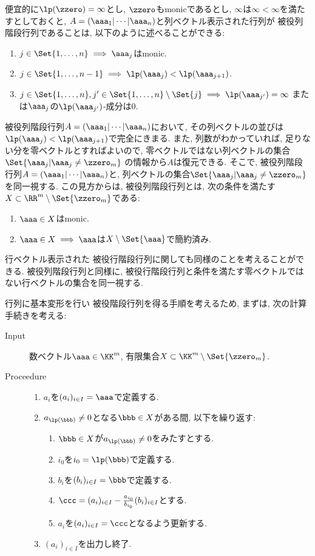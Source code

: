 便宜的に$\lp(\zzero)=\infty$とし, 
$\zzero$もmonicであるとし,
$\infty$は$\infty<\infty$を満たすとしておくと,
$A=(\aaa_1|\cdots|\aaa_n)$と列ベクトル表示された行列が
被役列階段行列であることは, 以下のように述べることができる:
\begin{enumerate}
\item
  $j\in\Set{1,\ldots,n}\implies \aaa_j$はmonic.
\item
  $j\in\Set{1,\ldots, n-1} \implies \lp(\aaa_j)<\lp(\aaa_{j+1})$.
\item
  $j\in\Set{1,\ldots, n}, j'\in \Set{1,\ldots, n}\setminus\Set{j}\implies \lp(\aaa_{j'})=\infty$
  または$\aaa_j$の$\lp(\aaa_{j'})$-成分は$0$.
\end{enumerate}
被役列階段行列$A=(\aaa_1|\cdots|\aaa_n)$において,
その列ベクトルの並びは
$\lp(\aaa_j)<\lp(\aaa_{j+1})$で完全にきまる.
また, 列数がわかっていれば, 足りない分を零ベクトルとすればよいので,
零ベクトルではない列ベクトルの集合$\Set{\aaa_j|\aaa_j\neq \zzero_m}$
の情報から$A$は復元できる.
そこで, 
被役列階段行列$A=(\aaa_1|\cdots|\aaa_n)$と,
列ベクトルの集合$\Set{\aaa_j|\aaa_j\neq \zzero_m}$を同一視する.
この見方からは,
被役列階段行列とは,
次の条件を満たす$X\subset \RR^m\setminus\Set{\zzero_m}$である:
\begin{enumerate}
\item
  $\aaa\in X$はmonic.
\item
  $\aaa\in X\implies \aaa$は$X\setminus \Set{\aaa}$で簡約済み.
\end{enumerate}
行ベクトル表示された
被役行階段行列に関しても同様のことを考えることができる.
被役列階段行列と同様に,
被役行階段行列と条件を満たす零ベクトルではない行ベクトルの集合を同一視する.

行列に基本変形を行い
被役階段行列を得る手順を考えるため,
まずは,
次の計算手続きを考える:
\begin{algorithm}\makebox{}
\begin{description}
\item[Input]
数ベクトル$\aaa\in \KK^m$,
有限集合$X\subset\KK^m\setminus\Set{\zzero_m}$.
\item[Proceedure]\makebox{}
  \begin{enumerate}
  \item $a_i$を$(a_i)_{i\in I}=\aaa$で定義する.
  \item $a_{\lp(\bbb)}\neq 0$となる$\bbb\in X$がある間, 以下を繰り返す:
    \begin{enumerate}
    \item $\bbb\in X$が$a_{\lp(\bbb)}\neq 0$をみたすとする.
    \item $i_0$を$i_0=\lp(\bbb)$で定義する.
    \item $b_i$を$(b_i)_{i\in I}=\bbb$で定義する.
    \item $\ccc=(a_i)_{i\in I}-\frac{a_{i_0}}{b_{i_0}}(b_i)_{i\in I}$とする.
    \item $a_i$を$(a_i)_{i\in I}=\ccc$となるよう更新する.
    \end{enumerate}
  \item $(a_i)_{i\in I}$を出力し終了.
  \end{enumerate}
\end{description}
\end{algorithm}

